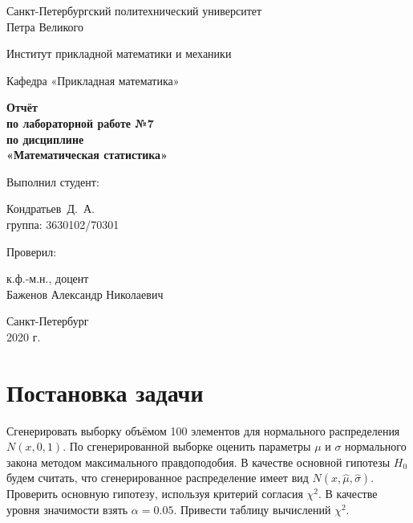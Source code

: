\documentclass[12pt,a4paper]{article}
\begin{document}
	\begin{titlepage}
		\begin{center}			
			Санкт-Петербургский политехнический университет\\
			Петра Великого
			\vspace{0.25cm}
			
			Институт прикладной математики и механики
			
			Кафедра «Прикладная математика»
			\vfill
			
			\textbf{Отчёт\\
				по лабораторной работе №7\\
				по дисциплине\\
				«Математическая статистика»}\\[5mm]
			\bigskip
		\end{center}
		\vfill
		
		\hfill\begin{minipage}{0.45\textwidth}
			Выполнил студент:
			\vspace{0.2cm}
			
			Кондратьев~Д.~А.\\
			группа: 3630102/70301
		\end{minipage}%
		\bigskip
		
		\hfill\begin{minipage}{0.45\textwidth}
			Проверил:
			\vspace{0.2cm}
			
			к.ф.-м.н., доцент\\
			Баженов Александр Николаевич
		\end{minipage}%
		\vfill
		
		\begin{center}
			Санкт-Петербург\\
			2020 г.
		\end{center}
	\end{titlepage}
	
	
	
	\tableofcontents{}
	\listoftables
	
	\newpage
	\section{Постановка задачи}
	Сгенерировать выборку объёмом 100 элементов для нормального распределения $N(x, 0, 1)$. По сгенерированной выборке оценить параметры $\mu$ и $\sigma$ нормального закона методом максимального правдоподобия. В качестве основной гипотезы $H_0$ будем считать, что сгенерированное распределение имеет вид $N(x, \hat{\mu}, \hat{\sigma})$. Проверить основную гипотезу, используя критерий согласия $\chi^2$. В качестве уровня значимости взять $\alpha = 0.05$. Привести таблицу вычислений $\chi^2$.
\end{document}
